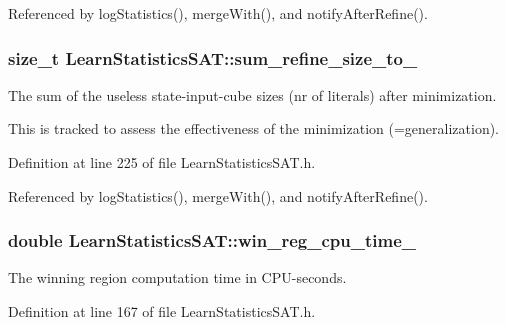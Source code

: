 Referenced by log\-Statistics(), merge\-With(), and notify\-After\-Refine().

\hypertarget{classLearnStatisticsSAT_ab64cce193c819cdd5c3a6838d99eb0a7}{
\subsubsection[{sum\-\_\-refine\-\_\-size\-\_\-to\-\_\-}]{\setlength{\rightskip}{0pt plus 5cm}size\-\_\-t Learn\-Statistics\-S\-A\-T\-::sum\-\_\-refine\-\_\-size\-\_\-to\-\_\-\hspace{0.3cm}{\ttfamily [protected]}}}\label{classLearnStatisticsSAT_ab64cce193c819cdd5c3a6838d99eb0a7}


The sum of the useless state-\/input-\/cube sizes (nr of literals) after minimization. 

This is tracked to assess the effectiveness of the minimization (=generalization). 

Definition at line 225 of file Learn\-Statistics\-S\-A\-T.\-h.



Referenced by log\-Statistics(), merge\-With(), and notify\-After\-Refine().

\hypertarget{classLearnStatisticsSAT_af9823be5155743223790ae01b91b7ca8}{
\subsubsection[{win\-\_\-reg\-\_\-cpu\-\_\-time\-\_\-}]{\setlength{\rightskip}{0pt plus 5cm}double Learn\-Statistics\-S\-A\-T\-::win\-\_\-reg\-\_\-cpu\-\_\-time\-\_\-\hspace{0.3cm}{\ttfamily [protected]}}}\label{classLearnStatisticsSAT_af9823be5155743223790ae01b91b7ca8}


The winning region computation time in C\-P\-U-\/seconds. 



Definition at line 167 of file Learn\-Statistics\-S\-A\-T.\-h.




